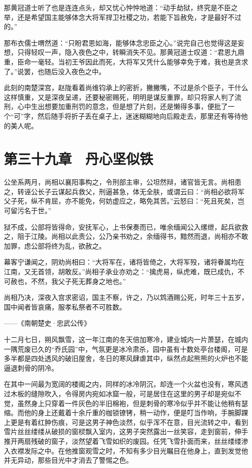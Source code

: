 那黄冠道士听了也是连连点头，却又忧心忡忡地道：“动手劫狱，终究是不臣之举，还是希望国主能够体念大将军捍卫社稷之功，若能下旨赦免，才是最好不过的。”

那布衣儒士喟然道：“只盼君恩如海，能够体念忠臣之心。”说完自己也觉得这是妄想，只得轻叹一声，隐入夜色之中，转瞬消失不见。那黄冠道士叹道：“君恩九鼎重，臣命一毫轻。当初王爷因此而死，大将军又凭什么能够幸免于难，我也是贪求了。”说罢，也随后没入夜色之中。

此刻的南楚深宫，赵陇看着尚维钧承上的密折，撇撇嘴，不过是杀个臣子，干什么这样慎重，又是深夜呈递，还要秘密赐死，明明是谋反重罪，却只将家人判了流刑，心中生出想要加重刑罚的意念，但是想了片刻，还是懒得多事，便批了一个“可”字，然后随手将折子丢在桌子上，迷迷糊糊地向后殿走去，那里还有等待他的美人呢。

\chapter{第三十九章　丹心坚似铁}

公坐系两月，尚相以襄阳事构之，令刑部主审，公坦然辩，诸官皆无言。尚相患之，转诬公长子云谋起兵救父，刑逼甚急，体无全肤，或谓云曰：“尚相必欲将军父子死，纵不肯屈，亦不能免，何妨虚应之，略免其苦。”云怒曰：“死且死矣，岂可留污名于世。”

狱不成，公部将皆得命，安抚军心，上书保奏而已，唯余缅闻公入缧绁，起兵欲救之，阻于江陵。尚相以此责公，公乃亲书劝之，余缅得书，黯然而退，尚相亦不敢加罪，虑公部将终为乱，欲赦之。

幕客宁谦闻之，阴劝尚相曰：“大将军在，诸将皆倚之，大将军殁，诸将眷属均在江南，又无首领，胡敢反。”尚相子承业亦劝之：“擒虎易，纵虎难，既已成仇，不可赦也，不然，我父子死无葬身之地也。”

尚相乃决，深夜入宫求密诏，国主不察，许之，乃以鸩酒赐公死，时年三十五岁，国中闻者皆哀痛，服孝私祭者不可胜数。

——《南朝楚史·忠武公传》

十二月七日，朔风飘雪，这一年江南的冬天倍加寒冷，建业城内一片萧瑟，在城内一隅荒废已久的“乔氏园”中，气氛更是冰冷肃杀，园中虽有十数处亭台楼阁，可是多半都是四处透风的破旧屋舍，冬日的寒风肆虐其中，纵然点起熊熊的火炉也不能逼退刺骨的阴冷。

在其中一间最为宽阔的楼阁之内，同样的冰冷阴沉，却连一个火盆也没有，寒风透过木板的缝隙吹入，令得房内宛如冰窟一般，可是居住在这里的男子却是宛似不觉，虽然身上只穿着一件灰色的半旧棉袍，但是刺骨的寒冷似乎并不能让他稍有瑟缩。而他的身上还戴着十余斤重的枷锁镣铐，稍一动作，便是叮当作响，手腕脚踝上更是有着红肿伤痕，可是这男子神色淡然，似乎浑不在意，目光流转之中，看到雪片丝丝缕缕从破损的窗棂飘入室内，这男子突然露出一丝笑容，走到窗前，伸手推开两扇残破的窗子，淡然望着飞雪如织的废园。任凭飞雪扑面而来，丝丝缕缕渗入衣襟发际之中。在他推窗观雪之时，不知有多少目光瞩目在他身上，直到发觉他并无异动，那些目光中才消去了警惕之色。

